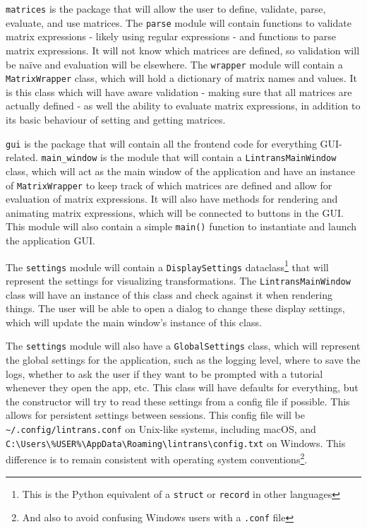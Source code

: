 \documentclass[../main.tex]{subfiles}
\begin{document}
\texttt{matrices} is the package that will allow the user to define, validate, parse, evaluate, and use matrices. The \texttt{parse} module will contain functions to validate matrix expressions - likely using regular expressions - and functions to parse matrix expressions. It will not know which matrices are defined, so validation will be na\"{i}ve and evaluation will be elsewhere. The \texttt{wrapper} module will contain a \texttt{MatrixWrapper} class, which will hold a dictionary of matrix names and values. It is this class which will have aware validation - making sure that all matrices are actually defined - as well the ability to evaluate matrix expressions, in addition to its basic behaviour of setting and getting matrices.

\texttt{gui} is the package that will contain all the frontend code for everything GUI-related. \texttt{main\_window} is the module that will contain a \texttt{LintransMainWindow} class, which will act as the main window of the application and have an instance of \texttt{MatrixWrapper} to keep track of which matrices are defined and allow for evaluation of matrix expressions. It will also have methods for rendering and animating matrix expressions, which will be connected to buttons in the GUI. This module will also contain a simple \texttt{main()} function to instantiate and launch the application GUI.

The \texttt{settings} module will contain a \texttt{DisplaySettings} dataclass\footnote{This is the Python equivalent of a \texttt{struct} or \texttt{record} in other languages} that will represent the settings for visualizing transformations. The \texttt{LintransMainWindow} class will have an instance of this class and check against it when rendering things. The user will be able to open a dialog to change these display settings, which will update the main window's instance of this class.

The \texttt{settings} module will also have a \texttt{GlobalSettings} class, which will represent the global settings for the application, such as the logging level, where to save the logs, whether to ask the user if they want to be prompted with a tutorial whenever they open the app, etc. This class will have defaults for everything, but the constructor will try to read these settings from a config file if possible. This allows for persistent settings between sessions. This config file will be \texttt{\textasciitilde/.config/lintrans.conf} on Unix-like systems, including macOS, and \texttt{C:{\textbackslash}Users{\textbackslash}\%USER\%{\textbackslash}AppData{\textbackslash}Roaming{\textbackslash}lintrans{\textbackslash}config.txt} on Windows. This difference is to remain consistent with operating system conventions\footnote{And also to avoid confusing Windows users with a \texttt{.conf} file}.
\end{document}
